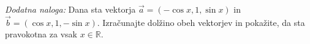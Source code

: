 \documentclass[addpoints]{exam}
\begin{document}
\begin{questions}


    \begin{solution}[10cm]

    \end{solution}





    \bonusquestion[3]
    \textit{Dodatna naloga:} Dana sta vektorja $\overrightarrow{a}=(-\cos x, 1, \sin x)$ in $\overrightarrow{b}=(\cos x, 1, -\sin x)$.
    Izračunajte dolžino obeh vektorjev in pokažite, da sta pravokotna za vsak $x\in\mathbb{R}$.

    \begin{solution}[1cm]

    \end{solution}

\end{questions}
\end{document}
